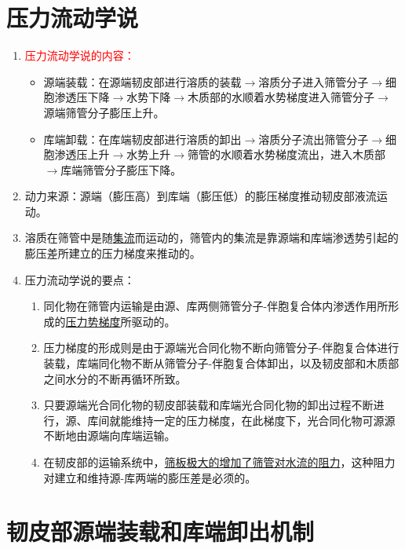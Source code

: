 \section{压力流动学说}
\begin{enumerate}
    \item \textcolor{red}{压力流动学说的内容：}
    \begin{itemize}
        \item 源端装载：在源端韧皮部进行溶质的装载$\to$溶质分子进入筛管分子$\to$细胞渗透压下降$\to$水势下降$\to$木质部的水顺着水势梯度进入筛管分子$\to$源端筛管分子膨压上升。
        \item 库端卸载：在库端韧皮部进行溶质的卸出$\to$溶质分子流出筛管分子$\to$细胞渗透压上升$\to$水势上升$\to$筛管的水顺着水势梯度流出，进入木质部$\to$库端筛管分子膨压下降。
    \end{itemize}
    \item 动力来源：源端（膨压高）到库端（膨压低）的膨压梯度推动韧皮部液流运动。
    \item 溶质在筛管中是随\uline{集流}而运动的，筛管内的集流是靠源端和库端渗透势引起的膨压差所建立的压力梯度来推动的。
    \item 压力流动学说的要点：
    \begin{enumerate}
        \item 同化物在筛管内运输是由源、库两侧筛管分子-伴胞复合体内渗透作用所形成的\uline{压力势梯度}所驱动的。
        \item 压力梯度的形成则是由于源端光合同化物不断向筛管分子-伴胞复合体进行装载，库端同化物不断从筛管分子-伴胞复合体卸出，以及韧皮部和木质部之间水分的不断再循环所致。
        \item 只要源端光合同化物的韧皮部装载和库端光合同化物的卸出过程不断进行，源、库间就能维持一定的压力梯度，在此梯度下，光合同化物可源源不断地由源端向库端运输。
        \item 在韧皮部的运输系统中，\uline{筛板极大的增加了筛管对水流的阻力}，这种阻力对建立和维持源-库两端的膨压差是必须的。
    \end{enumerate}
\end{enumerate}

\section{韧皮部源端装载和库端卸出机制}
